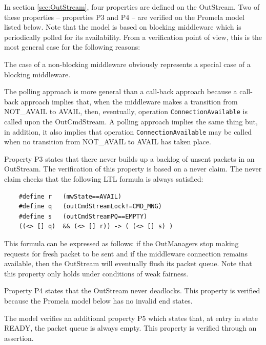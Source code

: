 \documentclass[a4paper,10pt]{article}
\newenvironment{fw_itemize}						%
{\begin{itemize}
  \setlength{\itemsep}{1mm}
  \setlength{\parskip}{0pt}
  \setlength{\parsep}{0pt}}
{\end{itemize}}
\begin{document}
In section \ref{sec:OutStream}, four properties are defined on the OutStream. Two of these properties – properties P3 and P4 – are verified on the Promela model listed below. Note that the model is based on blocking middleware which is periodically polled for its availability. From a verification point of view, this is the most general case for the following reasons:
\begin{fw_itemize}
\item The case of a non-blocking middleware obviously represents a special case of a blocking middleware.
\item The polling approach is more general than a call-back approach because a call-back approach implies that, when the middleware makes a transition from NOT\_AVAIL to AVAIL, then, eventually, operation \texttt{ConnectionAvailable} is called upon the OutCmdStream. A polling approach implies the same thing but, in addition, it also implies that operation \texttt{ConnectionAvailable} may be called when no transition from NOT\_AVAIL to AVAIL has taken place.
\end{fw_itemize}
Property P3 states that there never builds up a backlog of unsent packets in an OutStream. The verification of this property is based on a never claim. The never claim checks that the following LTL formula is always satisfied:

\lstset{belowskip=-14pt} %
\begin{lstlisting}
	#define r	(mwState==AVAIL)
	#define q	(outCmdStreamLock!=CMD_MNG)
	#define s	(outCmdStreamPQ==EMPTY)
	((<> [] q)  && (<> [] r)) -> ( (<> [] s) )
\end{lstlisting}

This formula can be expressed as follows: if the OutManagers stop making requests for fresh packet to be sent and if the middleware connection remains available, then the OutStream will eventually flush its packet queue. Note that this property only holds under conditions of weak fairness. 

Property P4 states that the OutStream never deadlocks. This property is verified because the Promela model below has no invalid end states.

The model verifies an additional property P5 which states that, at entry in state READY, the packet queue is always empty. This property is verified through an assertion.

\lstset{belowskip=-1pt}	%

\end{document}
